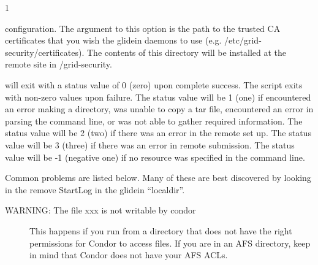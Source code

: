 \begin{ManPage}{\label{man-condor-glidein}}{1}
\begin{Options}
{        configuration.  The argument to this option is the path
        to the trusted CA certificates that you wish the glidein
        daemons to use (e.g. /etc/grid-security/certificates).  The
        contents of this directory will be installed at the remote
        site in /grid-security. }


\end{Options}

\ExitStatus

 will exit with a status value of 0 (zero) upon 
complete success.
The script exits with non-zero values upon failure.
The status value will be 1 (one) if 
 encountered an error making a directory,
was unable to copy a tar file,
encountered an error in parsing the command line,
or was not able to gather required information.
The status value will be 2 (two) if 
there was an error in the remote set up.
The status value will be 3 (three) if 
there was an error in remote submission.
The status value will be -1 (negative one) if 
no resource was specified in the command line.

Common problems are listed below.  Many of these are best discovered by
looking in the remove StartLog in the glidein ``localdir''.

\begin{description}

\item[WARNING: The file xxx is not writable by condor]  This happens if you
run  from a directory that does not have the right
permissions for Condor to access files.  If you are in an AFS directory,
keep in mind that Condor does not have your AFS ACLs.


\end{description}
\end{ManPage}
